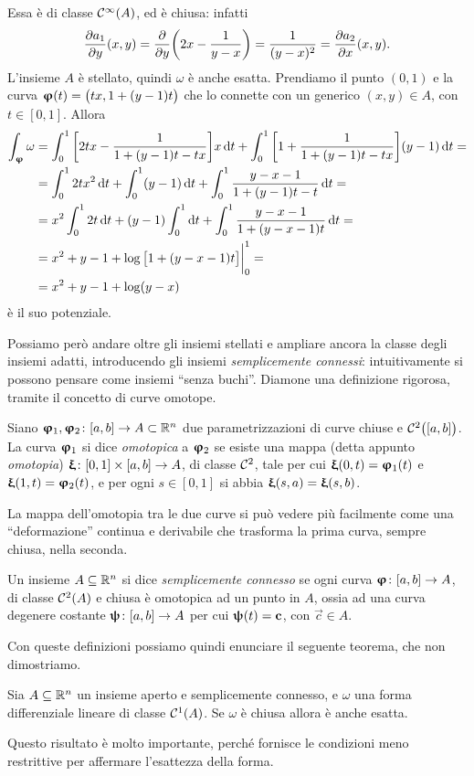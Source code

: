 Essa è di classe $\mathcal{C}^{{\infty}}(A)$, ed è chiusa: infatti
\begin{equation}
	\frac{\partial {a_1}}{\partial {y}}(x,y)=\frac{\partial {}}{\partial {y}}\bigg(2x-\frac1{y-x}\bigg)=\frac1{(y-x)^2}=\frac{\partial {a_2}}{\partial {x}}(x,y).
\end{equation}
L'insieme $A$ è stellato, quindi $\omega$ è anche esatta.
Prendiamo il punto $(0,1)$ e la curva $\bm{\upvarphi}(t)=\big(tx,1+(y-1)t\big)$ che lo connette con un generico $(x,y)\in A$, con $t\in[0,1]$. Allora
\begin{equation}
	\begin{split}
		\int_{\bm{\upvarphi}}\omega&=\int_0^1\bigg[2tx-\frac1{1+(y-1)t-tx}\bigg]x\,\textup{d} t+\int_0^1\bigg[1+\frac1{1+(y-1)t-tx}\bigg](y-1)\,\textup{d} t=\\
		&=\int_0^12tx^2\,\textup{d} t+\int_0^1(y-1)\,\textup{d} t+\int_0^1\frac{y-x-1}{1+(y-1)t-t}\,\textup{d} t=\\
		&=x^2\int_0^12t\,\textup{d} t+(y-1)\int_0^1\textup{d} t+\int_0^1\frac{y-x-1}{1+(y-x-1)t}\,\textup{d} t=\\
		&=x^2+y-1+\log\big[1+(y-x-1)t\big]\bigg|_0^1=\\
		&=x^2+y-1+\log(y-x)
	\end{split}
\end{equation}
è il suo potenziale.

Possiamo però andare oltre gli insiemi stellati e ampliare ancora la classe degli insiemi adatti, introducendo gli insiemi \emph{semplicemente connessi}: intuitivamente si possono pensare come insiemi ``senza buchi''.
Diamone una definizione rigorosa, tramite il concetto di curve omotope.
\begin{definizione} \label{d:curva-omotopica}
	Siano $\bm{\upvarphi}_1,\bm{\upvarphi}_2\colon[a,b]\to A\subset\mathbb{R}^n$ due parametrizzazioni di curve chiuse e $\mathcal{C}^{{2}}\big([a,b]\big)$.
	La curva $\bm{\upvarphi}_1$ si dice \emph{omotopica} a $\bm{\upvarphi}_2$ se esiste una mappa (detta appunto \emph{omotopia}) $\bm{\upxi}\colon[0,1]\times[a,b]\to A$, di classe $\mathcal{C}^{{2}}$, tale per cui $\bm{\upxi}(0,t)=\bm{\upvarphi}_1(t)$ e $\bm{\upxi}(1,t)=\bm{\upvarphi}_2(t)$, e per ogni $s\in[0,1]$ si abbia $\bm{\upxi}(s,a)=\bm{\upxi}(s,b)$.
\end{definizione}
La mappa dell'omotopia tra le due curve si può vedere più facilmente come una ``deformazione'' continua e derivabile che trasforma la prima curva, sempre chiusa, nella seconda.
\begin{definizione} \label{d:insieme-semplicemente-connesso}
	Un insieme $A\subseteq\mathbb{R}^n$ si dice \emph{semplicemente connesso} se ogni curva $\bm{\upvarphi}\colon[a,b]\to A$, di classe $\mathcal{C}^{{2}}(A)$ e chiusa è omotopica ad un punto in $A$, ossia ad una curva degenere costante $\bm{\uppsi}\colon[a,b]\to A$ per cui $\bm{\uppsi}(t)=\mathbf{c}$, con $\vec c\in A$.
\end{definizione}
Con queste definizioni possiamo quindi enunciare il seguente teorema, che non dimostriamo.
\begin{teorema} \label{t:poincare}
	Sia $A\subseteq\mathbb{R}^n$ un insieme aperto e semplicemente connesso, e $\omega$ una forma differenziale lineare di classe $\mathcal{C}^{{1}}(A)$. Se $\omega$ è chiusa allora è anche esatta.
\end{teorema}
Questo risultato è molto importante, perch\'e fornisce le condizioni meno restrittive per affermare l'esattezza della forma.
